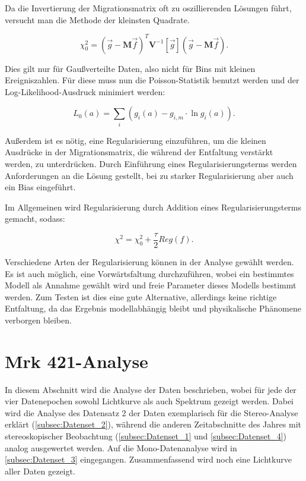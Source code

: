 Da die Invertierung der Migrationsmatrix oft zu oszillierenden Lösungen führt, versucht man die Methode der kleinsten Quadrate.

\begin{equation}
 \chi_0^2=(\vec{g}-\mathbf{M}\vec{f})^T \mathbf{V}^{-1}[\vec{g}](\vec{g}-\mathbf{M}\vec{f}).
\end{equation}

Dies gilt nur für Gaußverteilte Daten, also nicht für Bins mit kleinen Ereigniszahlen.
Für diese muss nun die Poisson-Statistik benutzt werden und der Log-Likelihood-Ausdruck minimiert werden:

\begin{equation}
 L_0(a)=\sum_i (g_i(a)-g_{i,m}\cdot \ln g_i(a)).
\end{equation}

Außerdem ist es nötig, eine Regularisierung einzuführen, um die kleinen Ausdrücke in der Migrationsmatrix, die während der Entfaltung verstärkt werden, zu unterdrücken.
Durch Einführung eines Regularisierungsterms werden Anforderungen an die Lösung gestellt, bei zu starker Regularisierung aber auch ein Bias eingeführt.

Im Allgemeinen wird Regularisierung durch Addition eines Regularisierungsterms gemacht, sodass:

\begin{equation}
 \chi^2=\chi_0^2 +\frac{\tau}{2} Reg(f).
\end{equation}

Verschiedene Arten der Regularisierung können in der Analyse gewählt werden.
Es ist auch möglich, eine Vorwärtsfaltung durchzuführen, wobei ein bestimmtes Modell als Annahme gewählt wird und freie Parameter dieses Modells bestimmt werden.
Zum Testen ist dies eine gute Alternative, allerdings keine richtige Entfaltung, da das Ergebnis modellabhängig bleibt und physikalische Phänomene verborgen bleiben.

\section{Mrk 421-Analyse}
\label{Mrk421_Analyse}
In diesem Abschnitt wird die Analyse der Daten beschrieben, wobei für jede der vier Datenepochen sowohl Lichtkurve als auch Spektrum gezeigt werden.
Dabei wird die Analyse des Datensatz 2 der Daten exemplarisch für die Stereo-Analyse erklärt (\autoref{subsec:Datenset_2}), während die anderen Zeitabschnitte des Jahres mit stereoskopischer Beobachtung (\autoref{subsec:Datenset_1} und \autoref{subsec:Datenset_4}) analog ausgewertet werden.
Auf die Mono-Datenanalyse wird in \autoref{subsec:Datenset_3} eingegangen.
Zusammenfassend wird noch eine Lichtkurve aller Daten gezeigt.



